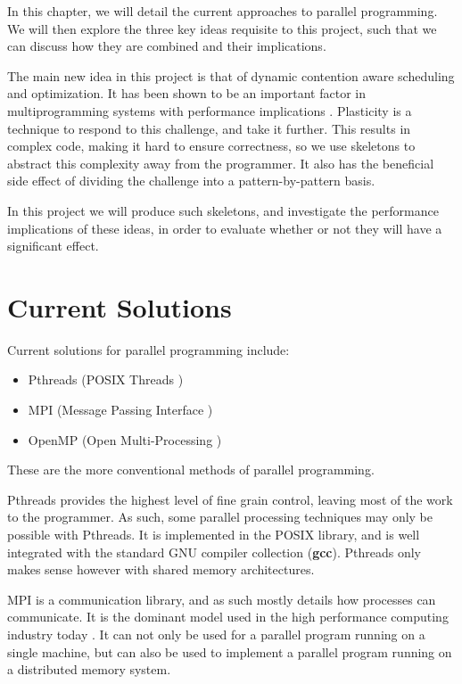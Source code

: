 
In this chapter, we will detail the current approaches to parallel programming. We will then explore the three key ideas requisite to this project, such that we can discuss how they are combined and their implications.

The main new idea in this project is that of dynamic contention aware scheduling and optimization. It has been shown to be an important factor in multiprogramming systems with performance implications \cite{lira}. Plasticity is a technique to respond to this challenge, and take it further. This results in complex code, making it hard to ensure correctness, so we use skeletons to abstract this complexity away from the programmer. It also has the beneficial side effect of dividing the challenge into a pattern-by-pattern basis.

In this project we will produce such skeletons, and investigate the performance implications of these ideas, in order to evaluate whether or not they will have a significant effect.



\section{Current Solutions}

Current solutions for parallel programming include:

\begin{itemize}
	\item Pthreads (POSIX Threads \cite{posix_threads})
	\item MPI 	   (Message Passing Interface \cite{mpi})
	\item OpenMP   (Open Multi-Processing \cite{openmp_home} \cite{openmp})
\end{itemize}

These are the more conventional methods of parallel programming.

Pthreads provides the highest level of fine grain control, leaving most of the work to the programmer. As such, some parallel processing techniques may only be possible with Pthreads. It is implemented in the POSIX library, and is well integrated with the standard GNU compiler collection (\textbf{gcc}). Pthreads only makes sense however with shared memory architectures.

MPI is a communication library, and as such mostly details how processes can communicate. It is the dominant model used in the high performance computing industry today \cite{mpi}. It can not only be used for a parallel program running on a single machine, but can also be used to implement a parallel program running on a distributed memory system.

